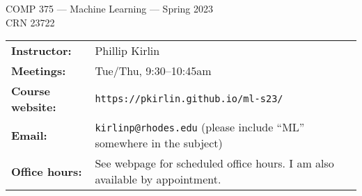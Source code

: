\documentclass [letterpaper,11pt]{article}
\begin{document}
\begin{center}
\Large COMP 375 --- Machine Learning --- Spring 2023
\\ \normalsize CRN 23722
\end{center}

\noindent\begin{tabular}{@{}ll}
\textbf{Instructor:} & Phillip Kirlin \\
\textbf{Meetings:} & Tue/Thu, 9:30--10:45am \\
\textbf{Course website:} & \texttt{https://pkirlin.github.io/ml-s23/} \\
\textbf{Email:} & \texttt{kirlinp@rhodes.edu} (please include ``ML'' somewhere in the subject)\\
\textbf{Office hours:} & See webpage for scheduled office hours.  I am also available by appointment.\\
\end{tabular}
\end{document}
